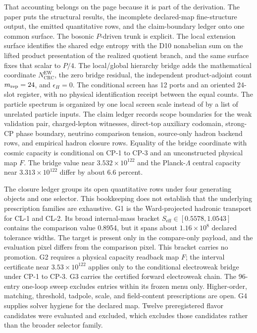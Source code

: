\documentclass[11pt]{article}
\begin{document}
That accounting belongs on the page because it is part of the derivation. The paper puts the
structural results, the incomplete declared-map fine-structure output, the emitted quantitative rows, and the
claim-boundary ledger onto one common surface. The bosonic \(P\)-driven trunk is explicit. The local
extension surface identifies the shared edge entropy with the D10 nonabelian sum on the lifted
product presentation of the realized quotient branch, and the same surface fixes that scalar to
\(P/4\). The local/global hierarchy bridge adds the mathematical coordinate
\(N_{\mathrm{CRC}}^{\mathrm{EW}}\), the zero bridge residual, the independent product-adjoint
count \(m_{\rm rep}=24\), and \(\epsilon_H=0\). The conditional screen has 12 ports and an
oriented 24-slot register, with no physical identification receipt between the equal counts. The particle spectrum is
organized by one local screen scale instead of by a list of unrelated particle inputs. The claim
ledger records scope boundaries for the weak validation pair, charged-lepton witnesses,
direct-top auxiliary codomain, strong-CP phase boundary,
neutrino comparison tension, source-only hadron backend rows, and empirical hadron closure rows.
Equality of the bridge coordinate with cosmic capacity is conditional on CP-1 to CP-3 and an
unconstructed physical map \(F\). The bridge value near \(3.532\times10^{122}\) and the
Planck-\(\Lambda\) central capacity near \(3.313\times10^{122}\) differ by about \(6.6\) percent.

The closure ledger groups its open quantitative rows under four generating objects and one
selector. This bookkeeping does not establish that the underlying prescription families are
exhaustive. G1 is the Ward-projected hadronic transport for CL-1 and CL-2. Its broad
internal-mass bracket \(S_{\mathrm{eff}}\in[0.5578,1.0543]\) contains the comparison value 0.8954,
but it spans about \(1.16\times10^8\) declared tolerance widths. The target is present only in the
compare-only payload, and the evaluation pixel differs from the comparison pixel. This bracket
carries no promotion. G2 requires a physical capacity readback map \(F\); the interval certificate
near \(3.53\times10^{122}\) applies only to the conditional electroweak bridge under CP-1 to CP-3.
G3 carries the certified forward electroweak chain. The 96-entry one-loop sweep excludes entries
within its frozen menu only. Higher-order, matching, threshold, tadpole, scale, and field-content
prescriptions are open. G4 supplies solver hygiene for the declared map. Twelve
preregistered flavor candidates were evaluated and excluded, which excludes those candidates
rather than the broader selector family.
\end{document}
